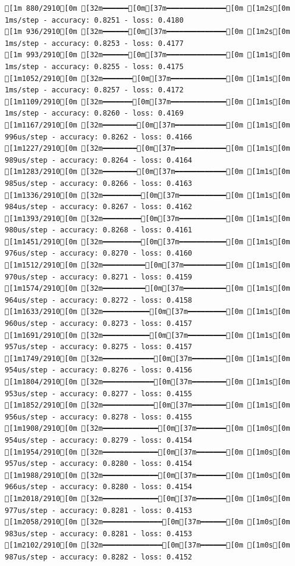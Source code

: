 \documentclass[
  letterpaper,
  DIV=11,
  numbers=noendperiod]{scrartcl}
\begin{document}
\begin{verbatim}
[1m 880/2910[0m [32m━━━━━━[0m[37m━━━━━━━━━━━━━━[0m [1m2s[0m 1ms/step - accuracy: 0.8251 - loss: 0.4180
[1m 936/2910[0m [32m━━━━━━[0m[37m━━━━━━━━━━━━━━[0m [1m2s[0m 1ms/step - accuracy: 0.8253 - loss: 0.4177
[1m 993/2910[0m [32m━━━━━━[0m[37m━━━━━━━━━━━━━━[0m [1m1s[0m 1ms/step - accuracy: 0.8255 - loss: 0.4175
[1m1052/2910[0m [32m━━━━━━━[0m[37m━━━━━━━━━━━━━[0m [1m1s[0m 1ms/step - accuracy: 0.8257 - loss: 0.4172
[1m1109/2910[0m [32m━━━━━━━[0m[37m━━━━━━━━━━━━━[0m [1m1s[0m 1ms/step - accuracy: 0.8260 - loss: 0.4169
[1m1167/2910[0m [32m━━━━━━━━[0m[37m━━━━━━━━━━━━[0m [1m1s[0m 996us/step - accuracy: 0.8262 - loss: 0.4166
[1m1227/2910[0m [32m━━━━━━━━[0m[37m━━━━━━━━━━━━[0m [1m1s[0m 989us/step - accuracy: 0.8264 - loss: 0.4164
[1m1283/2910[0m [32m━━━━━━━━[0m[37m━━━━━━━━━━━━[0m [1m1s[0m 985us/step - accuracy: 0.8266 - loss: 0.4163
[1m1336/2910[0m [32m━━━━━━━━━[0m[37m━━━━━━━━━━━[0m [1m1s[0m 984us/step - accuracy: 0.8267 - loss: 0.4162
[1m1393/2910[0m [32m━━━━━━━━━[0m[37m━━━━━━━━━━━[0m [1m1s[0m 980us/step - accuracy: 0.8268 - loss: 0.4161
[1m1451/2910[0m [32m━━━━━━━━━[0m[37m━━━━━━━━━━━[0m [1m1s[0m 976us/step - accuracy: 0.8270 - loss: 0.4160
[1m1512/2910[0m [32m━━━━━━━━━━[0m[37m━━━━━━━━━━[0m [1m1s[0m 970us/step - accuracy: 0.8271 - loss: 0.4159
[1m1574/2910[0m [32m━━━━━━━━━━[0m[37m━━━━━━━━━━[0m [1m1s[0m 964us/step - accuracy: 0.8272 - loss: 0.4158
[1m1633/2910[0m [32m━━━━━━━━━━━[0m[37m━━━━━━━━━[0m [1m1s[0m 960us/step - accuracy: 0.8273 - loss: 0.4157
[1m1691/2910[0m [32m━━━━━━━━━━━[0m[37m━━━━━━━━━[0m [1m1s[0m 957us/step - accuracy: 0.8275 - loss: 0.4157
[1m1749/2910[0m [32m━━━━━━━━━━━━[0m[37m━━━━━━━━[0m [1m1s[0m 954us/step - accuracy: 0.8276 - loss: 0.4156
[1m1804/2910[0m [32m━━━━━━━━━━━━[0m[37m━━━━━━━━[0m [1m1s[0m 953us/step - accuracy: 0.8277 - loss: 0.4155
[1m1852/2910[0m [32m━━━━━━━━━━━━[0m[37m━━━━━━━━[0m [1m1s[0m 956us/step - accuracy: 0.8278 - loss: 0.4155
[1m1908/2910[0m [32m━━━━━━━━━━━━━[0m[37m━━━━━━━[0m [1m0s[0m 954us/step - accuracy: 0.8279 - loss: 0.4154
[1m1954/2910[0m [32m━━━━━━━━━━━━━[0m[37m━━━━━━━[0m [1m0s[0m 957us/step - accuracy: 0.8280 - loss: 0.4154
[1m1988/2910[0m [32m━━━━━━━━━━━━━[0m[37m━━━━━━━[0m [1m0s[0m 966us/step - accuracy: 0.8280 - loss: 0.4154
[1m2018/2910[0m [32m━━━━━━━━━━━━━[0m[37m━━━━━━━[0m [1m0s[0m 977us/step - accuracy: 0.8281 - loss: 0.4153
[1m2058/2910[0m [32m━━━━━━━━━━━━━━[0m[37m━━━━━━[0m [1m0s[0m 983us/step - accuracy: 0.8281 - loss: 0.4153
[1m2102/2910[0m [32m━━━━━━━━━━━━━━[0m[37m━━━━━━[0m [1m0s[0m 987us/step - accuracy: 0.8282 - loss: 0.4152

\end{verbatim}
\end{document}
